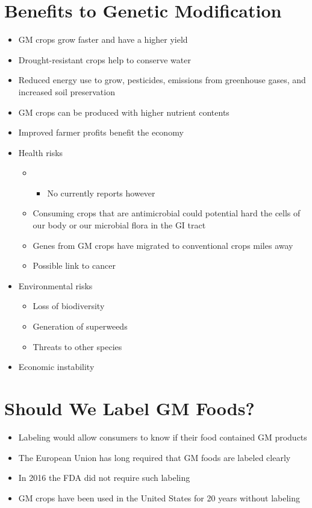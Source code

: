 \documentclass[title={Chapter 12}]{fdsn201notes}
\begin{document}
\section{Benefits to Genetic Modification}\label{sec:benefits-to-genetic-modification}
\begin{itemize}
	\item GM crops grow faster and have a higher yield
	\item Drought-resistant crops help to conserve water
	\item Reduced energy use to grow, pesticides, emissions from greenhouse gases, and increased soil preservation
	\item GM crops can be produced with higher nutrient contents
	\item Improved farmer profits benefit the economy
	\item Health risks
	\begin{itemize}
		\item {}
		\begin{itemize}
			\item No currently reports however
		\end{itemize}
		\item Consuming crops that are antimicrobial could potential hard the cells of our body or our microbial flora in the GI tract
		\item Genes from GM crops have migrated to conventional crops miles away
		\item Possible link to cancer
	\end{itemize}
	\item Environmental risks
	\begin{itemize}
		\item Loss of biodiversity
		\item Generation of superweeds
		\item Threats to other species
	\end{itemize}
	\item Economic instability
\end{itemize}

\section{Should We Label GM Foods?}\label{sec:should-we-label-gm-foods?}
\begin{itemize}
	\item Labeling would allow consumers to know if their food contained GM products
	\item The European Union has long required that GM foods are labeled clearly
	\item In 2016 the FDA did not require such labeling
	\item GM crops have been used in the United States for 20 years without labeling
\end{itemize}
\end{document}
